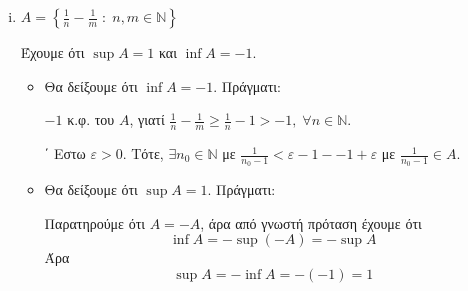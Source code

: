 \begin{multicols}{2}
\begin{enumerate}
\begin{enumerate}[i)]
\begin{proof}
\begin{itemize}
                                Άρα $ \frac{3}{2} = \max A_{2} $. Άρα $ \sup A_{2} = \max A_{2} 
                                = \frac{3}{2} $.

                            \item Θα δείξουμε ότι $ \inf A = -1 $. Πράγματι:

                                $ -1 $ κ.φ. του $A$, γιατί $ \frac{1}{n} + (-1)^{n} > -1, \; 
                                \forall n \in \mathbb{N} $.

                                (Δοκιμή: $ \frac{1}{2 n -1} -1 < -1 + \varepsilon 
                                \Leftrightarrow \frac{1}{2 n -1} < \varepsilon $,
                                το οποίο ισχύει, γιατί $ \frac{1}{2 n -1} < \frac{1}{n}, \forall 
                                n \in \mathbb{N} $).

                                Έστω $ \varepsilon > 0 $. Τότε $ \exists n_{0} \in \mathbb{N}  $ 
                                με $ \frac{1}{n_{0}} < \varepsilon $ τ.ω. $ \frac{1}{2 n_{0} -1} 
                                - 1 < \varepsilon -1 $, με $ \frac{1}{2 n_{0}} - 1 \in A $.
                        \end{itemize}
                    \end{proof}

                \item {\boldmath \textcolor{Col2} {$ A = \left\{ \frac{1}{n} - \frac{1}{m} \; : \; n,m \in 
                    \mathbb{N} \right\}$ }}

            Έχουμε ότι $ \sup A = 1 $  και $\inf A = -1 $.

            \begin{itemize}
                \item Θα δείξουμε ότι $ \inf A = -1 $. Πράγματι:

                    $ -1 $ κ.φ. του $A$, γιατί $ \frac{1}{n} - \frac{1}{m} \geq \frac{1}{n} 
                    - 1 > -1, \; \forall n \in \mathbb{N} $.

                    ΄
                    Εστω $ \varepsilon > 0 $. Τότε, $ \exists n_{0} \in \mathbb{N} $ με 
                    $ \frac{1}{n_{0} -1} < \varepsilon -1 - -1 + \varepsilon   $ με 
                    $ \frac{1}{n_{0} - 1} \in A $.

                \item Θα δείξουμε ότι $ \sup A = 1 $. Πράγματι:

                    Παρατηρούμε ότι $ A = -A $, άρα από γνωστή πρόταση έχουμε ότι 
                    \[ \inf A = - \sup (-A) = - \sup A \]
                    Άρα \[ \sup A = - \inf A = -(-1) = 1 \]
            \end{itemize}


\end{enumerate}
\end{enumerate}
\end{multicols}
